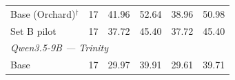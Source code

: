 \begin{table}[t]
{\begin{tabular}{lrrrrr}
Base (Orchard)$^{\dagger}$ & 17 & 41.96 & 52.64 & 38.96 & 50.98 \\
Set B pilot & 17 & 37.72 & 45.40 & 37.72 & 45.40 \\
\midrule
\multicolumn{6}{l}{\textit{Qwen3.5-9B --- Trinity}} \\
Base & 17 & 29.97 & 39.91 & 29.61 & 39.71 \\

\end{tabular}}
\end{table}
